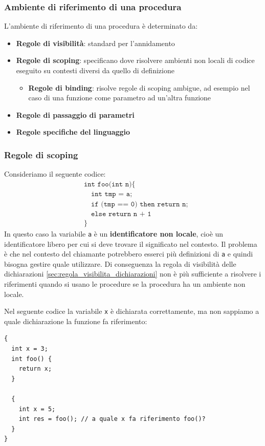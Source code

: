 \documentclass[a4paper]{article}
\begin{document}
\subsubsection{Ambiente di riferimento di una procedura}
L'ambiente di riferimento di una procedura è determinato da:
\begin{itemize}
  \item \textbf{Regole di visibilità}: standard per l'annidamento
  \item \textbf{Regole di scoping}: specificano dove risolvere ambienti non locali di codice
    eseguito su contesti diversi da quello di definizione
    \begin{itemize}
      \item \textbf{Regole di binding}: risolve regole di scoping ambigue, ad
        esempio nel caso di una funzione come parametro ad un'altra funzione
    \end{itemize}
  \item \textbf{Regole di passaggio di parametri}
  \item \textbf{Regole specifiche del linguaggio}
\end{itemize}

\subsubsection{Regole di scoping}
Consideriamo il seguente codice:
\[
  \begin{aligned}
    &\texttt{int foo(int n)}
    \texttt{\{}\\
    &\quad \texttt{int tmp = a;}\\
    &\quad \texttt{if (tmp == 0) then return n;}\\
    &\quad \texttt{else return n + 1 }\\
    &\texttt{\}}
  \end{aligned}
\] 
In questo caso la variabile \texttt{a} è un \textbf{identificatore non locale}, cioè
un identificatore libero per cui si deve trovare il significato nel contesto.
Il problema è che nel contesto del chiamante potrebbero esserci più definizioni
di \texttt{a} e quindi bisogna gestire quale utilizzare.
Di conseguenza la regola di visibilità delle dichiarazioni
\ref{sec:regola_visibilita_dichiarazioni} non è più sufficiente a risolvere i riferimenti
quando si usano le procedure se la procedura ha un ambiente non locale.

\vspace{1em}
\noindent
\begin{example}
  Nel seguente codice la variabile \texttt{x} è dichiarata correttamente, ma non
  sappiamo a quale dichiarazione la funzione fa riferimento:
\begin{lstlisting}
{
  int x = 3;
  int foo() {
    return x;
  }

  {
    int x = 5;
    int res = foo(); // a quale x fa riferimento foo()?
  }
}
\end{lstlisting}
\end{example}
\end{document}

